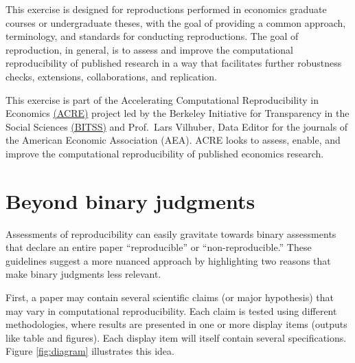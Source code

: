 \documentclass[]{book}
\begin{document}
This exercise is designed for reproductions performed in economics graduate courses or undergraduate theses, with the goal of providing a common approach, terminology, and standards for conducting reproductions. The goal of reproduction, in general, is to assess and improve the computational reproducibility of published research in a way that facilitates further robustness checks, extensions, collaborations, and replication.

This exercise is part of the Accelerating Computational Reproducibility in Economics \href{https://www.bitss.org/ecosystem/acre/}{(ACRE)} project led by the Berkeley Initiative for Transparency in the Social Sciences \href{bitss.org}{(BITSS)} and Prof.~Lars Vilhuber, Data Editor for the journals of the American Economic Association (AEA). ACRE looks to assess, enable, and improve the computational reproducibility of published economics research.

\hypertarget{beyond-binary-judgments}{%
\section*{Beyond binary judgments}\label{beyond-binary-judgments}}

Assessments of reproducibility can easily gravitate towards binary assessments that declare an entire paper ``reproducible'' or ``non-reproducible.'' These guidelines suggest a more nuanced approach by highlighting two reasons that make binary judgments less relevant.

First, a paper may contain several scientific claims (or major hypothesis) that may vary in computational reproducibility. Each claim is tested using different methodologies, where results are presented in one or more display items (outputs like table and figures). Each display item will itself contain several specifications. Figure \ref{fig:diagram} illustrates this idea.
\end{document}

